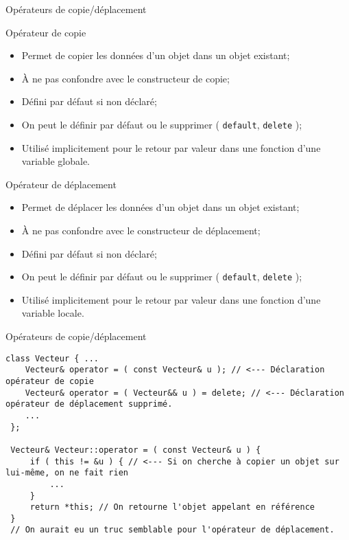 \documentclass[handout,10pt]{beamer}
\begin{document}
\begin{frame}{Opérateurs de copie/déplacement}
\tiny
\begin{block}{Opérateur de copie}
\begin{itemize}
\item Permet de copier les données d'un objet dans un objet existant;
\item \`A ne pas confondre avec le constructeur de copie;
\item Défini par défaut si non déclaré;
\item On peut le définir par défaut ou le supprimer ( \lstinline{default}, \lstinline{delete} );
\item Utilisé implicitement pour le retour par valeur dans une fonction d'une variable globale.
\end{itemize}
\end{block}

\begin{block}{Opérateur de déplacement}
\begin{itemize}
\item Permet de déplacer les données d'un objet dans un objet existant;
\item \`A ne pas confondre avec le constructeur de déplacement;
\item Défini par défaut si non déclaré;
\item On peut le définir par défaut ou le supprimer ( \lstinline{default}, \lstinline{delete} );
\item Utilisé implicitement pour le retour par valeur dans une fonction d'une variable locale.
\end{itemize}
\end{block}
\end{frame}

\begin{frame}[fragile]{Opérateurs de copie/déplacement}
\begin{lstlisting}
class Vecteur { ...
    Vecteur& operator = ( const Vecteur& u ); // <--- Déclaration opérateur de copie
    Vecteur& operator = ( Vecteur&& u ) = delete; // <--- Déclaration opérateur de déplacement supprimé.
    ...
 };
 
 Vecteur& Vecteur::operator = ( const Vecteur& u ) {
     if ( this != &u ) { // <--- Si on cherche à copier un objet sur lui-même, on ne fait rien
         ...
     }
     return *this; // On retourne l'objet appelant en référence
 }
 // On aurait eu un truc semblable pour l'opérateur de déplacement.
\end{lstlisting}
\end{frame}
\end{document}
